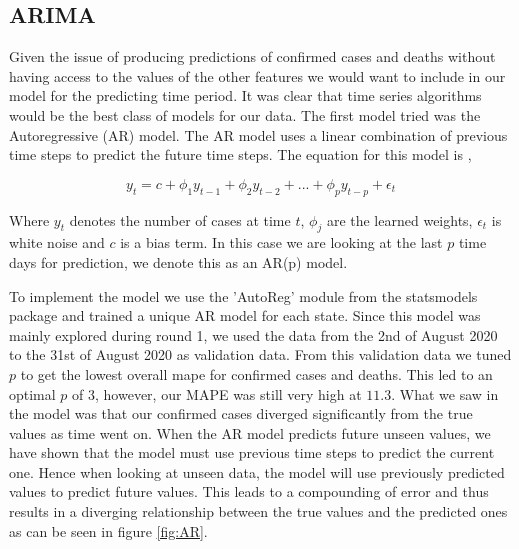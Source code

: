 \documentclass[sigconf,nonacm]{acmart}
\begin{document}
\subsection{ARIMA}

Given the issue of producing predictions of confirmed cases and deaths without
having access to the values of the other features we would want to include in
our model for the predicting time period. It was clear that time series
algorithms would be the best class of models for our data. The first model
tried was the Autoregressive (AR) model. The AR model uses a linear combination
of previous time steps to predict the future time steps. The equation for this
model is \cite{forecasting},

\begin{equation}
 y_t = c + \phi_1 y_{t-1} + \phi_2 y_{t-2} + ... + \phi_p y_{t-p} + \epsilon_t 
\end{equation}

Where $y_t$ denotes the number of cases at time $t$, $\phi_j$ are the learned
weights, $\epsilon_t$ is white noise and $c$ is a bias term. In this case we
are looking at the last $p$ time days for prediction, we denote this as an
AR(p) model. 

To implement the model we use the 'AutoReg' module from the statsmodels package
\cite{statsmodels} and trained a unique AR model for each state. Since this
model was mainly explored during round 1, we used the data from the 2nd of
August 2020 to the 31st of August 2020 as validation data. From this validation
data we tuned $p$ to get the lowest overall mape for confirmed cases and
deaths. This led to an optimal $p$ of 3, however, our MAPE was still very high
at $11.3$. What we saw in the model was that our confirmed cases diverged
significantly from the true values as time went on. When the AR model predicts
future unseen values, we have shown that the model must use previous time steps
to predict the current one. Hence when looking at unseen data, the model will
use previously predicted values to predict future values. This leads to a
compounding of error and thus results in a diverging relationship between the
true values and the predicted ones as can be seen in figure \ref{fig:AR}.
\end{document}
